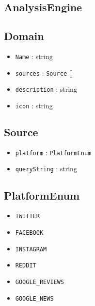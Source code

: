 \documentclass[12pt]{article}
\begin{document}
\subsection{AnalysisEngine}

\subsection{Domain}
\begin{itemize}
  \item \texttt{Name} : string
  \item \texttt{sources} : \texttt{Source} []
  \item \texttt{description} : string
  \item \texttt{icon} : string
\end{itemize}

\subsection{Source}
\begin{itemize}
  \item \texttt{platform} : \texttt{PlatformEnum}
  \item \texttt{queryString} : string
\end{itemize}

\subsection{PlatformEnum}
\begin{itemize}
  \item \texttt{TWITTER}
  \item \texttt{FACEBOOK}
  \item \texttt{INSTAGRAM}
  \item \texttt{REDDIT}
  \item \texttt{GOOGLE\_REVIEWS}
  \item \texttt{GOOGLE\_NEWS}
\end{itemize}

\newpage
\end{document}
